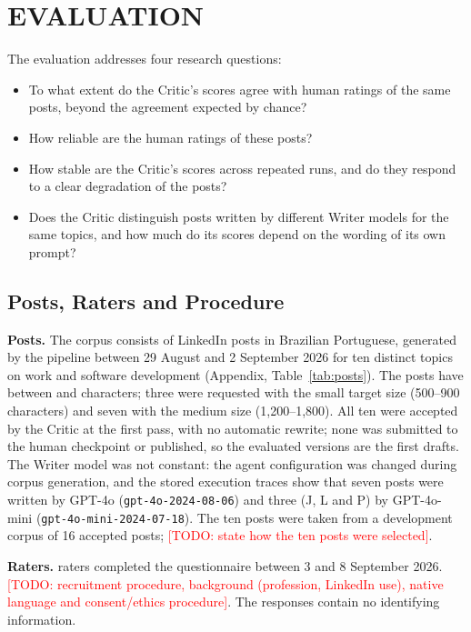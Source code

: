 \documentclass[a4paper,twoside]{article}
\newcommand{\TODO}[1]{\textcolor{red}{[TODO: #1]}}
\begin{document}
\section{\uppercase{Evaluation}}
\label{sec:evaluation}

The evaluation addresses four research questions:

\begin{itemize}
\item[\textbf{RQ1}] To what extent do the Critic's scores agree with human ratings of the same posts, beyond the agreement expected by chance?
\item[\textbf{RQ2}] How reliable are the human ratings of these posts?
\item[\textbf{RQ3}] How stable are the Critic's scores across repeated runs, and do they respond to a clear degradation of the posts?
\item[\textbf{RQ4}] Does the Critic distinguish posts written by different Writer models for the same topics, and how much do its scores depend on the wording of its own prompt?
\end{itemize}

\subsection{Posts, Raters and Procedure}
\label{sec:setup}

\textbf{Posts.} The corpus consists of \NPosts{} LinkedIn posts in Brazilian Portuguese, generated by the pipeline between 29 August and 2 September 2026 for ten distinct topics on work and software development (Appendix, Table~\ref{tab:posts}). The posts have between \CharMin{} and \CharMax{} characters; three were requested with the small target size (500--900 characters) and seven with the medium size (1,200--1,800). All ten were accepted by the Critic at the first pass, with no automatic rewrite; none was submitted to the human checkpoint or published, so the evaluated versions are the first drafts. The Writer model was not constant: the agent configuration was changed during corpus generation, and the stored execution traces show that seven posts were written by GPT-4o (\texttt{gpt-4o-2024-08-06}) and three (J, L and P) by GPT-4o-mini (\texttt{gpt-4o-mini-2024-07-18}). The ten posts were taken from a development corpus of 16 accepted posts; \TODO{state how the ten posts were selected}.

\textbf{Raters.} \NRaters{} raters completed the questionnaire between 3 and 8 September 2026. \TODO{recruitment procedure, background (profession, LinkedIn use), native language and consent/ethics procedure}. The responses contain no identifying information.
\end{document}
